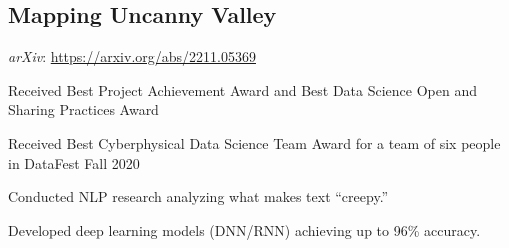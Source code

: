 \documentclass[11pt]{article}
\begin{document}
\subsection*{Mapping Uncanny Valley \hfill {}}
\noindent
\textit{arXiv}: \href{https://arxiv.org/abs/2211.05369}{https://arxiv.org/abs/2211.05369}
\begin{asparaitem}
    \item Received Best Project Achievement Award and Best Data Science Open and
    Sharing Practices Award
    \item Received Best Cyberphysical Data Science Team Award for a team of six people
    in DataFest Fall 2020
    \item Conducted NLP research analyzing what makes text “creepy.”
    \item Developed deep learning models (DNN/RNN) achieving up to 96\% accuracy.

\end{asparaitem}

\end{document}
